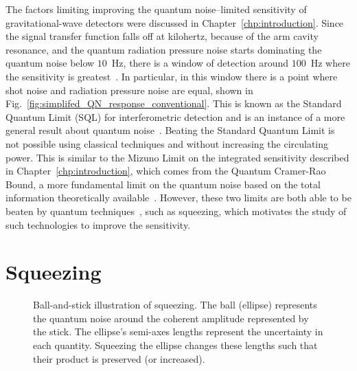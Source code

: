 The factors limiting improving the quantum noise--limited sensitivity of gravitational-wave detectors were discussed in Chapter~\ref{chp:introduction}. Since the signal transfer function falls off at kilohertz, because of the arm cavity resonance, and the quantum radiation pressure noise starts dominating the quantum noise below $10$~Hz, there is a window of detection around $100$~Hz where the sensitivity is greatest~\cite{}. In particular, in this window there is a point where shot noise and radiation pressure noise are equal, shown in Fig.~\ref{fig:simplifed_QN_response_conventional}.  %
This is known as the Standard Quantum Limit (SQL) for interferometric detection and is an instance of a more general result about quantum noise~\cite{}. Beating the Standard Quantum Limit is not possible using classical techniques  and without increasing the circulating power. This is similar to the Mizuno Limit on the integrated sensitivity described in Chapter~\ref{chp:introduction}, which comes from the Quantum Cramer-Rao Bound, a more fundamental limit on the quantum noise based on the total information theoretically available~\cite{MiaoQCRB2015}. However, these two limits are both able to be beaten  by quantum techniques~\cite{MiaoQCRB2015,}, such as squeezing, which motivates the study of such technologies to improve the sensitivity.



\section{Squeezing}
\label{sec:squeezing_background}

\begin{figure}
	\centering
	\caption{Ball-and-stick illustration of squeezing. The ball (ellipse) represents the quantum noise around the coherent amplitude represented by the stick. The ellipse's semi-axes lengths represent the uncertainty in each quantity. Squeezing the ellipse changes these lengths such that their product is preserved (or increased).}
	\label{fig:ballandstick_simple}
\end{figure}

